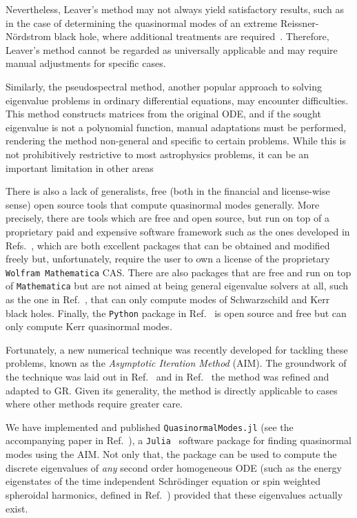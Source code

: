 Nevertheless, Leaver's method may not always yield satisfactory results, such as in the case of determining the quasinormal modes of an extreme Reissner-N\"ordstrom black hole, where additional treatments are required~\cite{PhysRevD.93.064062}. Therefore, Leaver's method cannot be regarded as universally applicable and may require manual adjustments for specific cases.

Similarly, the pseudospectral method, another popular approach to solving eigenvalue problems in ordinary differential equations, may encounter difficulties. This method constructs matrices from the original \ac{ODE}, and if the sought eigenvalue is not a polynomial function, manual adaptations must be performed, rendering the method non-general and specific to certain problems. While this is not prohibitively restrictive to most astrophysics problems, it can be an important limitation in other areas

There is also a lack of generalists, free (both in the financial and license-wise sense) open source tools that compute quasinormal modes generally. More precisely, there are tools which are free and open source, but run on top of a proprietary paid and expensive software framework such as the ones developed in Refs.~\cite{qnmspectral,spectralbp}, which are both excellent packages that can be obtained and modified freely but, unfortunately, require the user to own a license of the proprietary \texttt{Wolfram Mathematica} \ac{CAS}. There are also packages that are free and run on top of \texttt{Mathematica} but are not aimed at being general eigenvalue solvers at all, such as the one in Ref.~\cite{bhpt_quasinormalmodes}, that can only compute modes of Schwarzschild and Kerr black holes. Finally, the \texttt{Python} package in Ref.~\cite{bhpt_qnm} is open source and free but can only compute Kerr quasinormal modes.

Fortunately, a new numerical technique was recently developed for tackling these problems, known as the \emph{Asymptotic Iteration Method} (\ac{AIM}). The groundwork of the technique was laid out in Ref.~\cite{aim_original} and in Ref.~\cite{aim_improved} the method was refined and adapted to \ac{GR}. Given its generality, the method is directly applicable to cases where other methods require greater care.

We have implemented and published \texttt{QuasinormalModes.jl} (see the accompanying paper in Ref.~\cite{Sanches2022}), a \texttt{Julia}~\cite{Bezanson2017} software package for finding quasinormal modes using the \ac{AIM}. Not only that, the package can be used to compute the discrete eigenvalues of \emph{any} second order homogeneous \ac{ODE} (such as the energy eigenstates of the time independent Schrödinger equation or spin weighted spheroidal harmonics, defined in Ref.~\cite{PhysRevD.73.024013}) provided that these eigenvalues actually exist.

